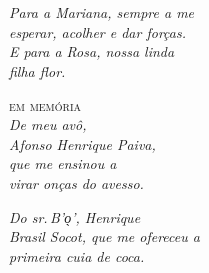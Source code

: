 



\chapter*{}
\thispagestyle{empty}

\vfill
\begin{flushright}
\small
\textit{
Para a Mariana, sempre a me \\
esperar, acolher e dar forças. \\
E para a Rosa, nossa linda \\
\textit{filha flor}.}

\bigskip
\medskip

\textsc{em memória}\\
\smallskip
\textit{
De meu avô, \\
Afonso Henrique Paiva,\\
que me ensinou a \\
virar onças do avesso.}

\smallskip
\textit{
Do sr.\,B'o̖', Henrique \\
Brasil Socot, que me ofereceu a \\
primeira cuia de coca.}
\end{flushright}